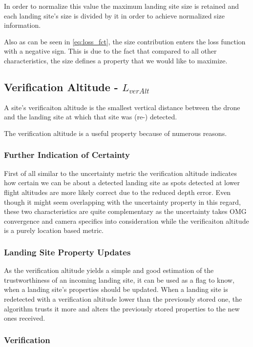 In order to normalize this value the maximum landing site size is retained and each landing site's size is divided by it in order to achieve normalized size information.

Also as can be seen in \cref{eq:loss_fct}, the size contribution enters the loss function with a negative sign. This is due to the fact that compared to all other characteristics, the size defines a property that we would like to maximize.

\subsection{Verification Altitude - $L_{verAlt}$}

A site's verificaiton altitude is the smallest vertical distance between the drone and the landing site at which that site was (re-) detected. 

The verification altitude is a useful property because of numerous reasons.
\subsubsection{Further Indication of Certainty}
First of all similar to the uncertainty metric the verification altitude indicates how certain we can be about a detected landing site as spots detected at lower flight altitudes are more likely correct due to the reduced depth error. Even though it might seem overlapping with the uncertainty property in this regard, these two characteristics are quite complementary as the uncertainty takes OMG convergence and camera specifics into consideration while the verificaiton altitude is a purely location based metric.

\subsubsection{Landing Site Property Updates}
As the verification altitude yields a simple and good estimation of the trustworthiness of an incoming landing site, it can be used as a flag to know, when a landing site's properties should be updated. When a landing site is redetected with a verification altitude lower than the previously stored one, the algorithm trusts it more and alters the previously stored properties to the new ones received.

\subsubsection{Verification}

